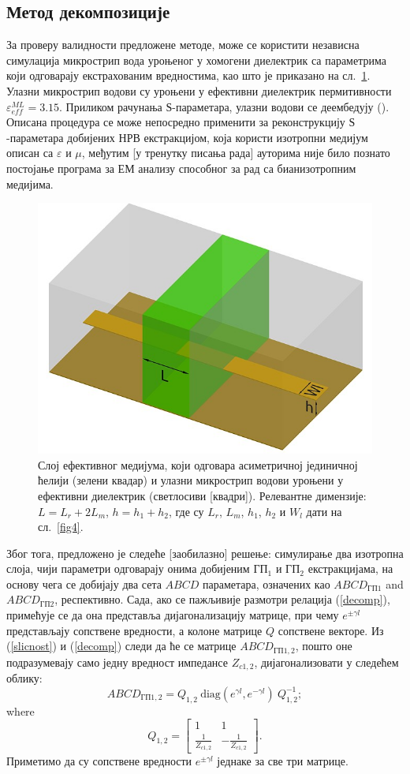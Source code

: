 \subsection{Метод декомпозиције}
За проверу валидности предложене методе, може се користити независна симулација микрострип вода уроњеног у хомогени диелектрик са параметрима који одговарају екстрахованим вредностима, као што је приказано на сл.~\ref{slab}. Улазни микрострип водови су уроњени у ефективни диелектрик пермитивности $\varepsilon^{ML}_{eff}=\num{3.15}$. Приликом рачунања $Ѕ$-параметара, улазни водови се деембедују (). Описана процедура се може непосредно применити за реконструкцију $Ѕ$-параметара добијених НРВ екстракцијом, која користи изотропни медијум описан са $\varepsilon$ и $\mu$, међутим [у тренутку писања рада] ауторима није било познато постојање програма за ЕМ анализу способног за рад са бианизотропним медијима.
\begin{figure}[!t]
\centering
\includegraphics[width=0.6\columnwidth]{slike/slab.jpeg}
\caption{Слој ефективног медијума, који одговара асиметричној јединичној ћелији (зелени квадар) и улазни микрострип водови уроњени у ефективни диелектрик (светлосиви [квадри]). Релевантне димензије: $L=L_r+2L_m$, $h=h_1+h_2$, где су $L_r$, $L_m$, $h_1$, $h_2$ и $W_l$ дати на сл.~\ref{fig4}.}
\label{slab}
\end{figure}

Због тога, предложено је следеће [заобилазно] решење: симулирање два изотропна слоја, чији параметри одговарају онима добијеним $ГП_1$ и $ГП_2$ екстракцијама, на основу чега се добијају два сета $ABCD$ параметара, означених као $ABCD_{ГП1}$ and $ABCD_{ГП2}$, респективно. Сада, ако се пажљивије размотри релација (\ref{decomp}), примећује се да она представља дијагонализацију матрице, при чему $e^{\pm \gamma l}$ представљају сопствене вредности, а колоне матрице $Q$ сопствене векторе. Из (\ref{slicnost}) и (\ref{decomp}) следи да ће се матрице $ABCD_{ГП1,2}$, пошто оне подразумевају само једну вредност импедансе $Z_{c1,2}$, дијагонализовати у следећем облику:
\begin{equation}\label{decomp2}
ABCD_{ГП1,2} = Q_{1,2}\: \mathrm{diag}(e^{\gamma l},e^{-\gamma l})\: Q_{1,2}^{-1};
\end{equation}
where
\begin{equation}
Q_{1,2} = 
\begin{bmatrix}
1 & 1 \\
\frac{1}{Z_{c1,2}} & -\frac{1}{Z_{c1,2}}
\end{bmatrix}.
\end{equation}
Приметимо да су сопствене вредности $e^{\pm \gamma l}$ једнаке за све три матрице.

